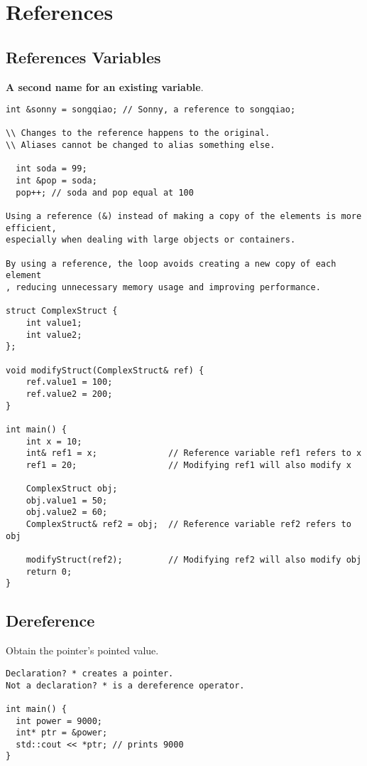 \section{References}

\subsection{References Variables}

\textbf{A second name for an existing variable}.

\begin{verbatim}
int &sonny = songqiao; // Sonny, a reference to songqiao;

\\ Changes to the reference happens to the original.
\\ Aliases cannot be changed to alias something else.

  int soda = 99;
  int &pop = soda;
  pop++; // soda and pop equal at 100

Using a reference (&) instead of making a copy of the elements is more efficient,
especially when dealing with large objects or containers. 

By using a reference, the loop avoids creating a new copy of each element
, reducing unnecessary memory usage and improving performance.

struct ComplexStruct {
    int value1;
    int value2;
};

void modifyStruct(ComplexStruct& ref) {
    ref.value1 = 100;
    ref.value2 = 200;
}

int main() {
    int x = 10;
    int& ref1 = x;              // Reference variable ref1 refers to x
    ref1 = 20;                  // Modifying ref1 will also modify x

    ComplexStruct obj;
    obj.value1 = 50;
    obj.value2 = 60;
    ComplexStruct& ref2 = obj;  // Reference variable ref2 refers to obj

    modifyStruct(ref2);         // Modifying ref2 will also modify obj
    return 0;
}
\end{verbatim}

\subsection{Dereference}

Obtain the pointer's pointed value. 

\begin{verbatim}
Declaration? * creates a pointer.
Not a declaration? * is a dereference operator.

int main() {
  int power = 9000;
  int* ptr = &power;
  std::cout << *ptr; // prints 9000
}
\end{verbatim}

